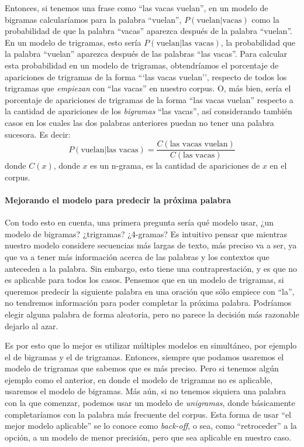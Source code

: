 \documentclass[a4paper]{article}
\begin{document}
Entonces, si tenemos una frase como ``las vacas vuelan'', en un modelo de bigramas calcularíamos para la palabra ``vuelan'', $P(\text{vuelan}|\text{vacas})$ como la probabilidad de que la palabra ``vacas'' aparezca después de la palabra ``vuelan''. En un modelo de trigramas, esto sería $P(\text{vuelan}|\text{las vacas})$, la probabilidad que la palabra ``vuelan'' aparezca después de las palabras ``las vacas''. Para calcular esta probabilidad en un modelo de trigramas, obtendríamos el porcentaje de apariciones de trigramas de la forma ```las vacas vuelan'', respecto de todos los trigramas que \textit{empiezan} con ``las vacas'' en nuestro corpus. O, más bien, sería el porcentaje de apariciones de trigramas de la forma ``las vacas vuelan'' respecto a la cantidad de apariciones de los \textit{bigramas} ``las vacas'', así considerando también casos en los cuales las dos palabras anteriores puedan no tener una palabra sucesora. Es decir:
\[
    P(\text{vuelan}|\text{las vacas}) = \frac{C(\text{las vacas vuelan})}{C(\text{las vacas})}
\]
donde $C(x)$, donde $x$ es un n-grama, es la cantidad de apariciones de $x$ en el corpus\cite{TdsGen}.

\paragraph{Mejorando el modelo para predecir la próxima palabra}

Con todo esto en cuenta, una primera pregunta sería qué modelo usar, ¿un modelo de bigramas? ¿trigramas? ¿4-gramas? Es intuitivo pensar que mientras nuestro modelo considere secuencias más largas de texto, más preciso va a ser, ya que va a tener más información acerca de las palabras y los contextos que anteceden a la palabra. Sin embargo, esto tiene una contraprestación, y es que no es aplicable para todos los casos. Pensemos que en un modelo de trigramas, si queremos predecir la siguiente palabra en una oración que sólo empiece con ``la'', no tendremos información para poder completar la próxima palabra. Podríamos elegir alguna palabra de forma aleatoria, pero no parece la decisión más razonable dejarlo al azar.

Es por esto que lo mejor es utilizar múltiples modelos en simultáneo, por ejemplo el de bigramas y el de trigramas. Entonces, siempre que podamos usaremos el modelo de trigramas que sabemos que es más preciso. Pero si tenemos algún ejemplo como el anterior, en donde el modelo de trigramas no es aplicable, usaremos el modelo de bigramas. Más aún, si no tenemos siquiera una palabra con la que comenzar, podemos usar un modelo de \textit{unigramas}, donde básicamente completaríamos con la palabra más frecuente del corpus. Esta forma de usar ``el mejor modelo aplicable'' se lo conoce como \textit{back-off}, o sea, como ``retroceder'' a la opción, a un modelo de menor precisión, pero que sea aplicable en nuestro caso.
\end{document}
